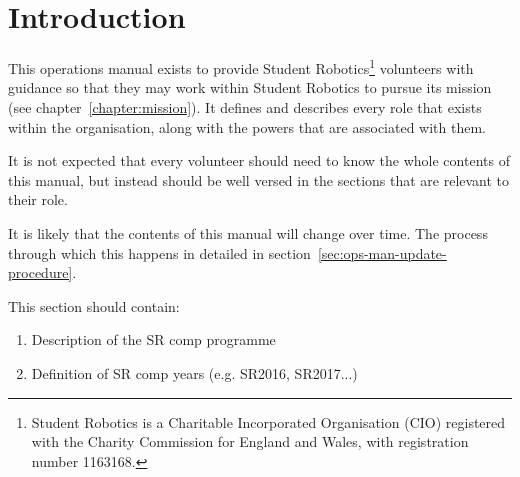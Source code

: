 \chapter{Introduction}

This operations manual exists to provide Student Robotics\footnote{Student Robotics is a Charitable Incorporated Organisation (CIO) registered with the Charity Commission for England and Wales, with registration number 1163168.} volunteers with guidance so that they may work within Student Robotics to pursue its mission (see chapter~\ref{chapter:mission}).  It defines and describes every role that exists within the organisation, along with the powers that are associated with them.

It is not expected that every volunteer should need to know the whole contents of this manual, but instead should be well versed in the sections that are relevant to their role.

It is likely that the contents of this manual will change over time.  The process through which this happens in detailed in section~\ref{sec:ops-man-update-procedure}.



This section should contain:
\begin{enumerate}
\item Description of the SR comp programme
\item Definition of SR comp years (e.g. SR2016, SR2017...)
\end{enumerate}
